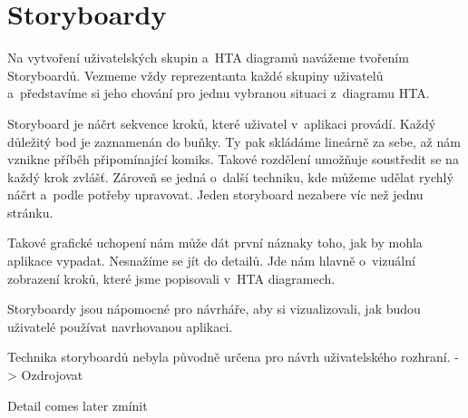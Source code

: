 \chapter{Storyboardy}


Na vytvoření uživatelských skupin a~HTA diagramů navážeme tvořením Storyboardů. Vezmeme vždy reprezentanta každé skupiny uživatelů a~představíme si jeho chování pro jednu vybranou situaci z~diagramu HTA.


Storyboard je náčrt sekvence kroků, které uživatel v~aplikaci provádí. Každý důležitý bod je zaznamenán do buňky. Ty pak skládáme lineárně za sebe, až nám vznikne příběh připomínající komiks. Takové rozdělení umožňuje soustředit se na každý krok zvlášť. Zároveň se jedná o~další techniku, kde můžeme udělat rychlý náčrt a~podle potřeby upravovat. Jeden storyboard nezabere víc než jednu stránku.

Takové grafické uchopení nám může dát první náznaky toho, jak by mohla aplikace vypadat. Nesnažíme se jít do detailů. Jde nám hlavně o~vizuální zobrazení kroků, které jsme popisovali v~HTA diagramech.

Storyboardy jsou nápomocné pro návrháře, aby si vizualizovali, jak budou uživatelé používat navrhovanou aplikaci. 

Technika storyboardů nebyla původně určena pro návrh uživatelského rozhraní. -> Ozdrojovat

Detail comes later zmínit
